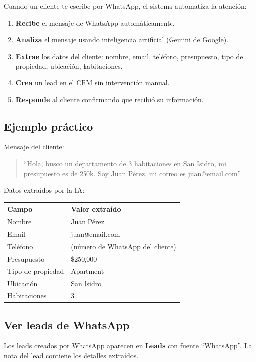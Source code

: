 \documentclass[12pt,oneside]{article}
\begin{document}
Cuando un cliente te escribe por WhatsApp, el sistema automatiza la atención:

\begin{enumerate}[leftmargin=*]
  \item \textbf{Recibe} el mensaje de WhatsApp automáticamente.
  \item \textbf{Analiza} el mensaje usando inteligencia artificial (Gemini de Google).
  \item \textbf{Extrae} los datos del cliente: nombre, email, teléfono, presupuesto, tipo de propiedad, ubicación, habitaciones.
  \item \textbf{Crea} un lead en el CRM sin intervención manual.
  \item \textbf{Responde} al cliente confirmando que recibió su información.
\end{enumerate}

\subsection{Ejemplo práctico}

\noindent Mensaje del cliente:
\begin{quote}
“Hola, busco un departamento de 3 habitaciones en San Isidro, mi presupuesto es de 250k. Soy Juan Pérez, mi correo es juan@email.com”
\end{quote}

\noindent Datos extraídos por la IA:

\begin{tabularx}{\textwidth}{|X|X|}
\hline
\rowcolor{primary!10}
\textbf{Campo} & \textbf{Valor extraído} \\
\hline
Nombre & Juan Pérez \\
\hline
Email & juan@email.com \\
\hline
Teléfono & (número de WhatsApp del cliente) \\
\hline
Presupuesto & \$250,000 \\
\hline
Tipo de propiedad & Apartment \\
\hline
Ubicación & San Isidro \\
\hline
Habitaciones & 3 \\
\hline
\end{tabularx}

\subsection{Ver leads de WhatsApp}

Los leads creados por WhatsApp aparecen en \textbf{Leads} con fuente “WhatsApp”. La nota del lead contiene los detalles extraídos.
\end{document}
